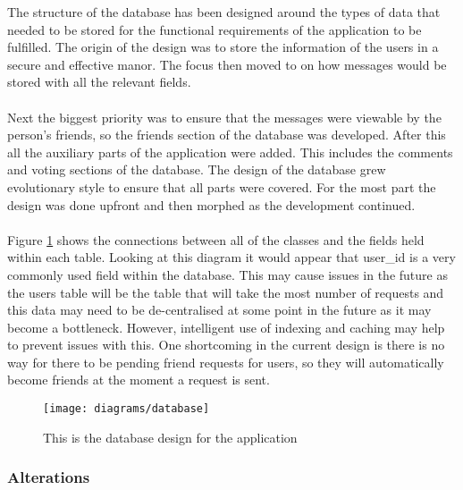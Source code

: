 The structure of the database has been designed around the types of data that needed to be stored for the functional requirements of the application to be fulfilled. The origin of the design was to store the information of the users in a secure and effective manor. The focus then moved to on how messages would be stored with all the relevant fields.\\
\\
Next the biggest priority was to ensure that the messages were viewable by the person's friends, so the friends section of the database was developed. After this all the auxiliary parts of the application were added. This includes the comments and voting sections of the database. The design of the database grew evolutionary style to ensure that all parts were covered. For the most part the design was done upfront and then morphed as the development continued.\\
\\
Figure \ref{fig:diagram_database_image} shows the connections between all of the classes and the fields held within each table. Looking at this diagram it would appear that user\_id is a very commonly used field within the database. This may cause issues in the future as the users table will be the table that will take the most number of requests and this data may need to be de-centralised at some point in the future as it may become a bottleneck. However, intelligent use of indexing and caching may help to prevent issues with this. One shortcoming in the current design is there is no way for there to be pending friend requests for users, so they will automatically become friends at the moment a request is sent.

\begin{figure}[H]
    \centering
    \texttt{[image: diagrams/database]}
    \caption{This is the database design for the application}
    \label{fig:diagram_database_image}
\end{figure} 


\subsubsection{Alterations}

